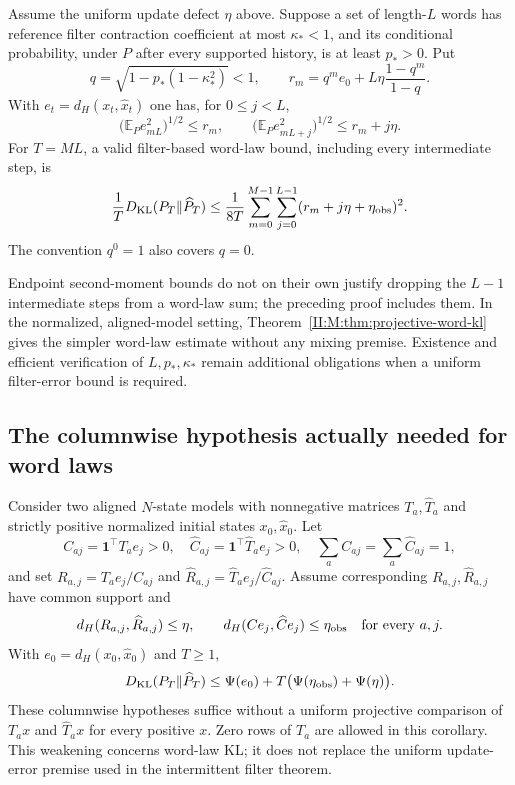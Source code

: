 \begin{proposition}
\label{II:M:prop:intermittent-projective-filter}
Assume the uniform update defect $\eta$ above. Suppose a set of
length-$L$ words has reference filter contraction coefficient at most
$\kappa_*<1$, and its conditional probability, under $P$ after every
supported history, is at least $p_*>0$. Put
\[
 q=\sqrt{1-p_*(1-\kappa_*^2)}<1,\qquad
 r_m=q^m e_0+L\eta\frac{1-q^m}{1-q}.
\]
With $e_t=d_H(x_t,\widehat x_t)$ one has, for $0\le j<L$,
\[
 \bigl(\mathbb E_P e_{mL}^2\bigr)^{1/2}\le r_m,
 \qquad
 \bigl(\mathbb E_P e_{mL+j}^2\bigr)^{1/2}\le r_m+j\eta.
\]
For $T=ML$, a valid filter-based word-law bound, including every
intermediate step, is
\[
 \frac1T D_{\rm KL}(P_T\|\widehat P_T)
 \le\frac1{8T}\sum_{m=0}^{M-1}\sum_{j=0}^{L-1}
                  (r_m+j\eta+\eta_{\rm obs})^2.
\]
The convention $q^0=1$ also covers $q=0$.
\end{proposition}


Endpoint second-moment bounds do not on their own justify dropping the
$L-1$ intermediate steps from a word-law sum; the preceding proof includes
them. In the normalized,
aligned-model setting, Theorem~\ref{II:M:thm:projective-word-kl} gives the
simpler word-law estimate without any mixing premise. Existence and
efficient verification of $L,p_*,\kappa_*$ remain additional obligations
when a uniform filter-error bound is required.


\subsection{The columnwise hypothesis actually needed for word laws}
\begin{corollary}\label{II:M:rev13:cor:column-word}
Consider two aligned $N$-state models with nonnegative matrices
$T_a,\widehat T_a$ and strictly positive normalized initial states
$x_0,\widehat x_0$. Let
\[
 C_{aj}=\mathbf1^\top T_ae_j>0,\quad
 \widehat C_{aj}=\mathbf1^\top\widehat T_ae_j>0,\quad
 \sum_a C_{aj}=\sum_a\widehat C_{aj}=1,
\]
and set $R_{a,j}=T_ae_j/C_{aj}$ and
$\widehat R_{a,j}=\widehat T_ae_j/\widehat C_{aj}$.
Assume corresponding $R_{a,j},\widehat R_{a,j}$ have common support and
\[
 d_H(R_{a,j},\widehat R_{a,j})\le\eta,\qquad
 d_H(Ce_j,\widehat Ce_j)\le\eta_{\rm obs}
 \quad\text{for every }a,j.
\]
With $e_0=d_H(x_0,\widehat x_0)$ and $T\ge1$,
\[
 D_{\rm KL}(P_T\Vert\widehat P_T)
 \le\Psi(e_0)+T\bigl(\Psi(\eta_{\rm obs})+\Psi(\eta)\bigr).
\]
These columnwise hypotheses suffice without a uniform projective
comparison of $T_ax$ and $\widehat T_ax$ for every positive $x$.
Zero rows of $T_a$ are allowed in this corollary. This weakening concerns
word-law KL; it does not replace the uniform update-error premise used
in the intermittent filter theorem.
\end{corollary}



